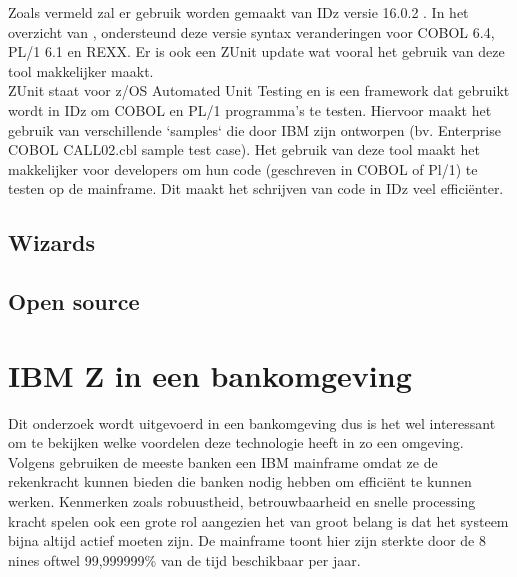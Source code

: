 Zoals vermeld zal er gebruik worden gemaakt van IDz versie 16.0.2 . In het overzicht van \textcite{IBM2024}, ondersteund deze versie syntax veranderingen voor COBOL 6.4, PL/1 6.1 en REXX. Er is ook een ZUnit update wat vooral het gebruik van deze tool makkelijker maakt. \\

ZUnit staat voor z/OS Automated Unit Testing en is een framework dat gebruikt wordt in IDz om COBOL en PL/1 programma's te testen. Hiervoor maakt het gebruik van verschillende `samples` die door IBM zijn ontworpen (bv. Enterprise COBOL CALL02.cbl sample test case). Het gebruik van deze tool maakt het makkelijker voor developers om hun code (geschreven in COBOL of Pl/1) te testen op de mainframe. Dit maakt het schrijven van code in IDz veel efficiënter. \autocite{IBM2024a}

\subsection{Wizards}

\subsection{Open source}


\section{IBM Z in een bankomgeving}
Dit onderzoek wordt uitgevoerd in een bankomgeving dus is het wel interessant om te bekijken welke voordelen deze technologie heeft in zo een omgeving. \\ 
Volgens \textcite{Turner2022} gebruiken de meeste banken een IBM mainframe omdat ze de rekenkracht kunnen bieden die banken nodig hebben om efficiënt te kunnen werken. Kenmerken zoals robuustheid, betrouwbaarheid en snelle processing kracht spelen ook een grote rol aangezien het van groot belang is dat het systeem bijna altijd actief moeten zijn. De mainframe toont hier zijn sterkte door de 8 nines oftwel 99,999999\% van de tijd beschikbaar per jaar. \autocite{IBMa}
